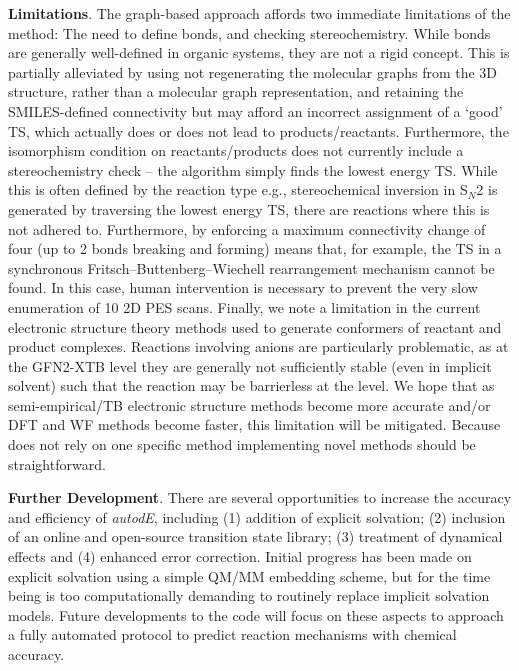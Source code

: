 \documentclass[../../main.tex]{subfiles}
\begin{document}
{\bfseries{Limitations}}. The graph-based approach affords two immediate limitations of the method: The need to define bonds, and checking stereochemistry. While bonds are generally well-defined in organic systems, they are not a rigid concept. This is partially alleviated by using not regenerating the molecular graphs from the 3D structure, rather than a molecular graph representation, and retaining the SMILES-defined connectivity but may afford an incorrect assignment of a ‘good’ TS, which actually does or does not lead to products/reactants. Furthermore, the isomorphism condition on reactants/products does not currently include a stereochemistry check – the algorithm simply finds the lowest energy TS. While this is often defined by the reaction type e.g., stereochemical inversion in S$_N$2 is generated by traversing the lowest energy TS, there are reactions where this is not adhered to. Furthermore, by enforcing a maximum connectivity change of four (up to 2 bonds breaking and forming) means that, for example, the TS in a synchronous Fritsch–Buttenberg–Wiechell rearrangement mechanism cannot be found. In this case, human intervention is necessary to prevent the very slow enumeration of 10 2D PES scans. Finally, we note a limitation in the current \lmethodx electronic structure theory methods used to generate conformers of reactant and product complexes. Reactions involving anions are particularly problematic, as at the GFN2-XTB level they are generally not sufficiently stable (even in implicit solvent) such that the reaction may be barrierless at the \lmethodx level. We hope that as semi-empirical/TB electronic structure methods become more accurate and/or DFT and WF methods become faster, this limitation will be mitigated. Because \ade does not rely on one specific method implementing novel methods should be straightforward.

{\bfseries{Further Development}}. There are several opportunities to increase the accuracy and efficiency of \emph{autodE}, including (1) addition of explicit solvation; (2) inclusion of an online and open-source transition state library; (3) treatment of dynamical effects and (4) enhanced error correction. Initial progress has been made on explicit solvation using a simple QM/MM embedding scheme, but for the time being is too computationally demanding to routinely replace implicit solvation models. Future developments to the code will focus on these aspects to approach a fully automated protocol to predict reaction mechanisms with chemical accuracy.
\end{document}
